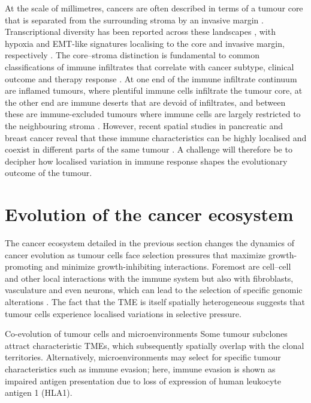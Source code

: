 At the scale of millimetres, cancers are often described in terms of a tumour core that is separated from the surrounding stroma by an invasive margin . Transcriptional diversity has been reported across these landscapes \parencite{Berglund2018-gh}, with hypoxia and \ac{EMT}-like signatures localising to the core and invasive margin, respectively \parencite{Puram2017-mn,Thomlinson1955-em}. The core–stroma distinction is fundamental to common classifications of immune infiltrates that correlate with cancer subtype, clinical outcome and therapy response \parencite{Hammerl2021-fs,Keren2018-or,Galon2014-oi}. At one end of the immune infiltrate continuum are inflamed tumours, where plentiful immune cells infiltrate the tumour core, at the other end are immune deserts that are devoid of infiltrates, and between these are immune-excluded tumours where immune cells are largely restricted to the neighbouring stroma \parencite{Hegde2020-sw}. However, recent spatial studies in pancreatic and breast cancer reveal that these immune characteristics can be highly localised and coexist in different parts of the same tumour \parencite{Danenberg2022-zb,Grunwald2021-zk,Tavernari2021-yb}. A challenge will therefore be to decipher how localised variation in immune response shapes the evolutionary outcome of the tumour.

\section{Evolution of the cancer ecosystem}

The cancer ecosystem detailed in the previous section changes the dynamics of cancer evolution as tumour cells face selection pressures that maximize growth-promoting and minimize growth-inhibiting interactions. Foremost are cell–cell and other local interactions with the immune system but also with fibroblasts, vasculature and even neurons, which can lead to the selection of specific genomic alterations . The fact that the \ac{TME} is itself spatially heterogeneous suggests that tumour cells experience localised variations in selective pressure.

    {Co-evolution of tumour cells and microenvironments \parencite{Seferbekova2023-wg}}
    {Some tumour subclones attract characteristic \acfp{TME}, which subsequently spatially overlap with the clonal territories. Alternatively, microenvironments may select for specific tumour characteristics such as immune evasion; here, immune evasion is shown as impaired antigen presentation due to loss of expression of human leukocyte antigen 1 (HLA1).}

